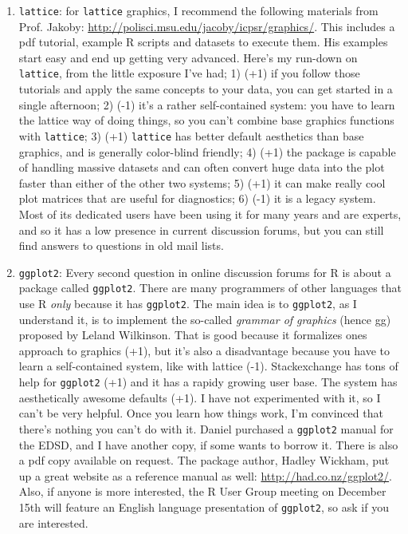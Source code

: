 \documentclass[a4paper]{article}
\begin{document}
\begin{enumerate}
\item{\texttt{lattice}}: for \texttt{lattice} graphics, I recommend the following materials from Prof. Jakoby: \url{http://polisci.msu.edu/jacoby/icpsr/graphics/}\citep{jacoby1998statistical}. This includes a pdf tutorial, example R scripts and datasets to execute them. His examples start easy and end up getting very advanced. Here's my run-down on \texttt{lattice}, from the little exposure I've had; 1) (+1) if you follow those tutorials and apply the same concepts to your data, you can get started in a single afternoon; 2) (-1) it's a rather self-contained system: you have to learn the lattice way of doing things, so you can't combine base graphics functions with \texttt{lattice}; 3) (+1) \texttt{lattice} has better default aesthetics than base graphics, and is generally color-blind friendly; 4) (+1) the package is capable of handling massive datasets and can often convert huge data into the plot faster than either of the other two systems; 5) (+1) it can make really cool plot matrices that are useful for diagnostics; 6) (-1) it is a legacy system. Most of its dedicated users have been using it for many years and are experts, and so it has a low presence in current discussion forums, but you can still find answers to questions in old mail lists.

\item{\texttt{ggplot2}}: Every second question in online discussion forums for R is about a package called \texttt{ggplot2}. There are many programmers of other languages that use R \textit{only} because it has \texttt{ggplot2}. The main idea is to \texttt{ggplot2}, as I understand it, is to implement the so-called \textit{grammar of graphics} (hence gg) proposed by Leland Wilkinson\citep{wilkinson2010grammar}. That is good because it formalizes ones approach to graphics (+1), but it's also a disadvantage because you have to learn a self-contained system, like with lattice (-1). Stackexchange has tons of help for \texttt{ggplot2} (+1) and it has a rapidy growing user base. The system has aesthetically awesome defaults (+1). I have not experimented with it, so I can't be very helpful. Once you learn how things work, I'm convinced that there's nothing you can't do with it. Daniel purchased a \texttt{ggplot2} manual for the EDSD\citep{ggplot22009}, and I have another copy, if some wants to borrow it. There is also a pdf copy available on request.  The package author, Hadley Wickham, put up a great website as a reference manual as well: \url{http://had.co.nz/ggplot2/}. Also, if anyone is more interested, the R User Group meeting on December 15th will feature an English language presentation of \texttt{ggplot2}, so ask if you are interested. 


\end{enumerate}
\end{document}
